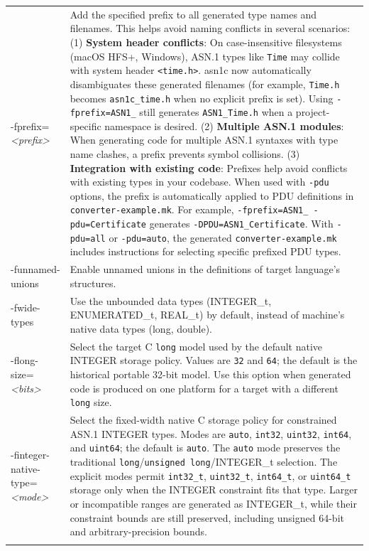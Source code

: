 \documentclass[english,oneside,12pt]{book}
\begin{document}
\begin{longtable}{lp{4in}}
{\ttfamily -fprefix=\emph{<prefix>}} & {\small Add the specified prefix to all generated type names and filenames. This helps avoid naming conflicts in several scenarios: (1) \textbf{System header conflicts}: On case-insensitive filesystems (macOS HFS+, Windows), ASN.1 types like \texttt{Time} may collide with system header \texttt{<time.h>}. asn1c now automatically disambiguates these generated filenames (for example, \texttt{Time.h} becomes \texttt{asn1c\_time.h} when no explicit prefix is set). Using \texttt{-fprefix=ASN1\_} still generates \texttt{ASN1\_Time.h} when a project-specific namespace is desired. (2) \textbf{Multiple ASN.1 modules}: When generating code for multiple ASN.1 syntaxes with type name clashes, a prefix prevents symbol collisions. (3) \textbf{Integration with existing code}: Prefixes help avoid conflicts with existing types in your codebase. When used with \texttt{-pdu} options, the prefix is automatically applied to PDU definitions in \texttt{converter-example.mk}. For example, \texttt{-fprefix=ASN1\_ -pdu=Certificate} generates \texttt{-DPDU=ASN1\_Certificate}. With \texttt{-pdu=all} or \texttt{-pdu=auto}, the generated \texttt{converter-example.mk} includes instructions for selecting specific prefixed PDU types.}\\
{\ttfamily -funnamed-unions} & {\small Enable  unnamed  unions in the definitions of target language's structures.}\\
{\ttfamily -fwide-types} & {\small Use the unbounded data types (INTEGER\_t, ENUMERATED\_t, REAL\_t) by default, instead of machine's native data types (long, double).}\\
{\ttfamily -flong-size=\emph{<bits>}} & {\small Select the target C \texttt{long} model used by the default native INTEGER storage policy. Values are \texttt{32} and \texttt{64}; the default is the historical portable 32-bit model. Use this option when generated code is produced on one platform for a target with a different \texttt{long} size.}\\
{\ttfamily -finteger-native-type=\emph{<mode>}} & {\small Select the fixed-width native C storage policy for constrained ASN.1 INTEGER types. Modes are \texttt{auto}, \texttt{int32}, \texttt{uint32}, \texttt{int64}, and \texttt{uint64}; the default is \texttt{auto}. The \texttt{auto} mode preserves the traditional \texttt{long}/\texttt{unsigned long}/INTEGER\_t selection. The explicit modes permit \texttt{int32\_t}, \texttt{uint32\_t}, \texttt{int64\_t}, or \texttt{uint64\_t} storage only when the INTEGER constraint fits that type. Larger or incompatible ranges are generated as INTEGER\_t, while their constraint bounds are still preserved, including unsigned 64-bit and arbitrary-precision bounds.}\\\\

\end{longtable}
\end{document}
